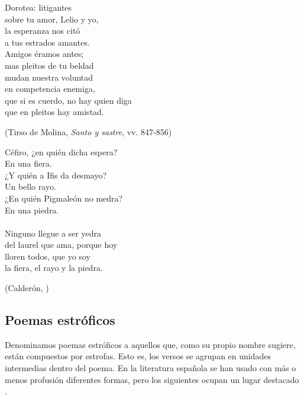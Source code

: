 \begin{exe}
	\ex\label{ex:decima}\begin{multicols}{2}
	Dorotea: litigantes\\
	sobre tu amor, Lelio y yo,\\
	la esperanza nos citó\\
	a tus estrados amantes.\vspace{.333\baselineskip}\\
	
	Amigos éramos antes;\\
	mas pleitos de tu beldad\vspace{.333\baselineskip}\\	
	mudan nuestra voluntad\\
	en competencia enemiga,\\
	que si es cuerdo, no hay quien diga\\
	que en pleitos hay amistad.\end{multicols}
	\strut\hfill(Tirso de Molina, \textit{Santo y sastre}, vv. 847-856\nocite{tirso_santoysastre})
	\ex\strut\label{ex:ovillejo}\begin{multicols}{2}
		Céfiro, ¿en quién dicha espera?\\
		En una fiera.\vspace{.333\baselineskip}\\
		¿Y quién a Ifis da desmayo?\\
		Un bello rayo.\vspace{.333\baselineskip}\\
		¿En quién Pigmaleón no medra?\\
		En una piedra.\vspace{.333\baselineskip}\\
		\vspace{.333\baselineskip}\\
		Ninguno llegue a ser yedra\\
		del laurel que ama, porque hoy\\
		lloren todos, que yo soy\\
		la fiera, el rayo y la piedra.\\
	\end{multicols}	
	\strut\hfill(Calderón, )
\end{exe}


\subsection{Poemas estróficos}
Denominamos poemas estróficos a aquellos que, como su propio nombre sugiere, están compuestos por estrofas. Esto es, los versos se agrupan en unidades intermedias dentro del poema. En la literatura española se han usado con más o menos profusión diferentes formas, pero los siguientes ocupan un lugar destacado \parencite[126-150]{quilis2013}.


